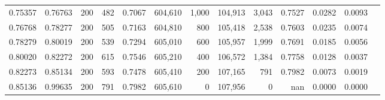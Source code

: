 \begin{tabular}{rrrrrrrrrrrrr}
0.75357 & 0.76763 &    200 & 482 &                                     0.7067 & 604,610 &   1,000 & 104,913 &   3,043 & 0.7527 & 0.0282 & 0.0093 \\
0.76768 & 0.78277 &    200 & 505 &                                     0.7163 & 604,810 &     800 & 105,418 &   2,538 & 0.7603 & 0.0235 & 0.0074 \\
0.78279 & 0.80019 &    200 & 539 &                                     0.7294 & 605,010 &     600 & 105,957 &   1,999 & 0.7691 & 0.0185 & 0.0056 \\
0.80020 & 0.82272 &    200 & 615 &                                     0.7546 & 605,210 &     400 & 106,572 &   1,384 & 0.7758 & 0.0128 & 0.0037 \\
0.82273 & 0.85134 &    200 & 593 &                                     0.7478 & 605,410 &     200 & 107,165 &     791 & 0.7982 & 0.0073 & 0.0019 \\
0.85136 & 0.99635 &    200 & 791 &                                     0.7982 & 605,610 &       0 & 107,956 &       0 &    nan & 0.0000 & 0.0000 \\
\bottomrule
\end{tabular}
